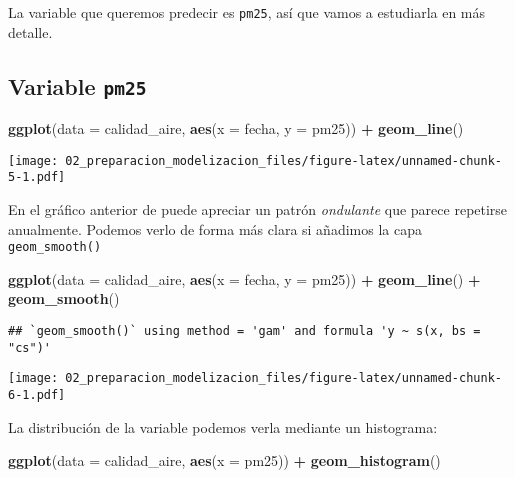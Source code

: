 \documentclass[]{article}
\newenvironment{Shaded}{\begin{snugshade}}{\end{snugshade}}
\newcommand{\DataTypeTok}[1]{\textcolor[rgb]{0.13,0.29,0.53}{#1}}
\newcommand{\KeywordTok}[1]{\textcolor[rgb]{0.13,0.29,0.53}{\textbf{#1}}}
\newcommand{\NormalTok}[1]{#1}
\newcommand{\OperatorTok}[1]{\textcolor[rgb]{0.81,0.36,0.00}{\textbf{#1}}}
\newcommand{\StringTok}[1]{\textcolor[rgb]{0.31,0.60,0.02}{#1}}
\begin{document}
La variable que queremos predecir es \texttt{pm25}, así que vamos a
estudiarla en más detalle.

\hypertarget{variable-pm25}{%
\subsection{\texorpdfstring{Variable
\texttt{pm25}}{Variable pm25}}\label{variable-pm25}}

\begin{Shaded}
\begin{Highlighting}[]
\KeywordTok{ggplot}\NormalTok{(}\DataTypeTok{data =}\NormalTok{ calidad_aire,}
       \KeywordTok{aes}\NormalTok{(}\DataTypeTok{x =}\NormalTok{ fecha, }\DataTypeTok{y =}\NormalTok{ pm25)) }\OperatorTok{+}\StringTok{ }
\StringTok{  }\KeywordTok{geom_line}\NormalTok{()}
\end{Highlighting}
\end{Shaded}

\texttt{[image: 02\_preparacion\_modelizacion\_files/figure-latex/unnamed-chunk-5-1.pdf]}

En el gráfico anterior de puede apreciar un patrón \emph{ondulante} que
parece repetirse anualmente. Podemos verlo de forma más clara si
añadimos la capa \texttt{geom\_smooth()}

\begin{Shaded}
\begin{Highlighting}[]
\KeywordTok{ggplot}\NormalTok{(}\DataTypeTok{data =}\NormalTok{ calidad_aire,}
       \KeywordTok{aes}\NormalTok{(}\DataTypeTok{x =}\NormalTok{ fecha, }\DataTypeTok{y =}\NormalTok{ pm25)) }\OperatorTok{+}\StringTok{ }
\StringTok{  }\KeywordTok{geom_line}\NormalTok{() }\OperatorTok{+}
\StringTok{  }\KeywordTok{geom_smooth}\NormalTok{()}
\end{Highlighting}
\end{Shaded}

\begin{verbatim}
## `geom_smooth()` using method = 'gam' and formula 'y ~ s(x, bs = "cs")'
\end{verbatim}

\texttt{[image: 02\_preparacion\_modelizacion\_files/figure-latex/unnamed-chunk-6-1.pdf]}

La distribución de la variable podemos verla mediante un histograma:

\begin{Shaded}
\begin{Highlighting}[]
\KeywordTok{ggplot}\NormalTok{(}\DataTypeTok{data =}\NormalTok{ calidad_aire,}
       \KeywordTok{aes}\NormalTok{(}\DataTypeTok{x =}\NormalTok{ pm25)) }\OperatorTok{+}\StringTok{ }
\StringTok{  }\KeywordTok{geom_histogram}\NormalTok{()}
\end{Highlighting}
\end{Shaded}
\end{document}
